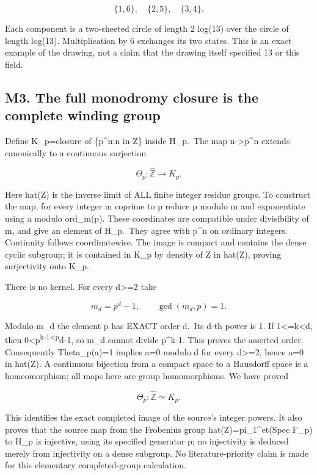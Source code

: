 \[
\{1,6\},\quad\{2,5\},\quad\{3,4\}.
\tag{M2.6}
\]

Each component is a two-sheeted circle of length 2 log(13) over the
circle of length log(13). Multiplication by 6 exchanges its two states.
This is an exact example of the drawing, not a claim that the drawing
itself specified 13 or this field.

\subsection{M3. The full monodromy closure is the complete winding
group}\label{m3.-the-full-monodromy-closure-is-the-complete-winding-group}

Define K\_p=closure of \{p\^{}n:n in Z\} inside H\_p.~The map
n-\textgreater p\^{}n extends canonically to a continuous surjection

\[
\Theta_p:\widehat{\mathbb Z}\longrightarrow K_p.
\tag{M3.1}
\]

Here hat(Z) is the inverse limit of ALL finite integer residue groups.
To construct the map, for every integer m coprime to p reduce p modulo m
and exponentiate using a modulo ord\_m(p). These coordinates are
compatible under divisibility of m, and give an element of H\_p.~They
agree with p\^{}n on ordinary integers. Continuity follows
coordinatewise. The image is compact and contains the dense cyclic
subgroup; it is contained in K\_p by density of Z in hat(Z), proving
surjectivity onto K\_p.

There is no kernel. For every d\textgreater=2 take

\[
m_d=p^d-1,\qquad \gcd(m_d,p)=1.
\tag{M3.2}
\]

Modulo m\_d the element p has EXACT order d.~Its d-th power is 1. If
1\textless=k\textless d, then
0\textless p\textsuperscript{k-1\textless p}d-1, so m\_d cannot divide
p\^{}k-1. This proves the asserted order. Consequently Theta\_p(a)=1
implies a=0 modulo d for every d\textgreater=2, hence a=0 in hat(Z). A
continuous bijection from a compact space to a Hausdorff space is a
homeomorphism; all maps here are group homomorphisms. We have proved

\[
\boxed{\Theta_p:\widehat{\mathbb Z}\simeq K_p.}
\tag{M3.3}
\]

This identifies the exact completed image of the source's integer
powers. It also proves that the source map from the Frobenius group
hat(Z)=pi\_1\^{}et(Spec F\_p) to H\_p is injective, using its specified
generator p; no injectivity is deduced merely from injectivity on a
dense subgroup. No literature-priority claim is made for this elementary
completed-group calculation.

